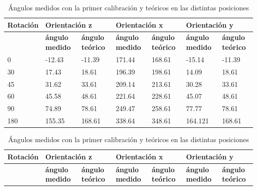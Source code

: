 \documentclass[main]{subfiles}
\begin{document}
\begin{table}
\begin{tabular}{|p{50pt}|p{50pt}|p{50pt}|p{50pt}|p{51pt}|p{50pt}|p{50pt}|}
\hline
 {\cellcolor[gray]{0.6} \textbf{Rotación}}  
& \multicolumn{2}{|p{113pt}|}{\cellcolor[gray]{0.6} \textbf{Orientación z}}  
& \multicolumn{2}{|p{114pt}|}{\cellcolor[gray]{0.6} \textbf{Orientación x}}
& \multicolumn{2}{|p{113pt}|}{\cellcolor[gray]{0.6} \textbf{Orientación y}} 
\\ \hline 
   
& \multicolumn{1}{|p{50pt}|}{\cellcolor[gray]{0.7} \textbf{ángulo medido }} 
& \multicolumn{1}{|p{50pt}|}{\cellcolor[gray]{0.8} \textbf{ángulo teórico}}
& \multicolumn{1}{|p{50pt}|}{\cellcolor[gray]{0.7} \textbf{ángulo medido}} 
& \multicolumn{1}{|p{51pt}|}{\cellcolor[gray]{0.8} \textbf{ángulo teórico}}
& \multicolumn{1}{|p{50pt}|}{\cellcolor[gray]{0.7} \textbf{ángulo medido}} 
& \multicolumn{1}{|p{50pt}|}{\cellcolor[gray]{0.8} \textbf{ángulo teórico}}
\\ \hline

 0    &    -12.43  & -11.39& 171.44& 168.61&-15.14 & -11.39\\ \hline
 30   &   17.43    & 18.61& 196.39& 198.61 & 14.09 & 18.61 \\ \hline
 45   &   31.62 	  &	33.61 & 209.14 & 213.61 & 30.28 & 33.61 \\ \hline
 60   &   45.58 	  & 48.61 & 221.64 & 228.61 & 45.07 & 48.61 \\ \hline
 90   &   74.89 	  & 78.61 & 249.47 & 258.61 & 77.77 & 78.61 \\ \hline
 180  &   155.35	  &	168.61& 338.64 & 348.61 & 164.121 & 168.61 \\ \hline
 
\end{tabular}
\caption{Ángulos medidos con la primer calibración y teóricos en las distintas posiciones}



\begin{tabular}{|p{50pt}|p{50pt}|p{50pt}|p{50pt}|p{51pt}|p{50pt}|p{50pt}|}
\hline
 {\cellcolor[gray]{0.6} \textbf{Rotación}}  
& \multicolumn{2}{|p{113pt}|}{\cellcolor[gray]{0.6} \textbf{Orientación z}}  
& \multicolumn{2}{|p{114pt}|}{\cellcolor[gray]{0.6} \textbf{Orientación x}}
& \multicolumn{2}{|p{113pt}|}{\cellcolor[gray]{0.6} \textbf{Orientación y}} 
\\ \hline 
   
& \multicolumn{1}{|p{50pt}|}{\cellcolor[gray]{0.7} \textbf{ángulo medido }} 
& \multicolumn{1}{|p{50pt}|}{\cellcolor[gray]{0.8} \textbf{ángulo teórico}}
& \multicolumn{1}{|p{50pt}|}{\cellcolor[gray]{0.7} \textbf{ángulo medido}} 
& \multicolumn{1}{|p{51pt}|}{\cellcolor[gray]{0.8} \textbf{ángulo teórico}}
& \multicolumn{1}{|p{50pt}|}{\cellcolor[gray]{0.7} \textbf{ángulo medido}} 
& \multicolumn{1}{|p{50pt}|}{\cellcolor[gray]{0.8} \textbf{ángulo teórico}}
\\ \hline


\end{tabular}
\end{table}
\end{document}
